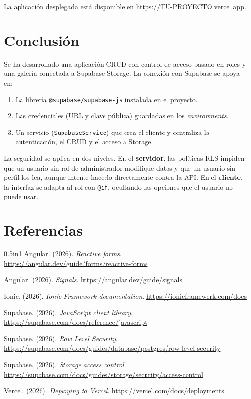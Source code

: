\documentclass[a4paper, 12pt]{article}
\begin{document}
La aplicación desplegada está disponible en
\url{https://TU-PROYECTO.vercel.app}.

\section{Conclusión}

Se ha desarrollado una aplicación CRUD con control de acceso basado en roles y
una galería conectada a Supabase Storage. La conexión con Supabase se apoya en:

\begin{enumerate}
  \item La librería \texttt{@supabase/supabase-js} instalada en el proyecto.
  \item Las credenciales (URL y clave pública) guardadas en los
        \textit{environments}.
  \item Un servicio (\texttt{SupabaseService}) que crea el cliente y centraliza
        la autenticación, el CRUD y el acceso a Storage.
\end{enumerate}

La seguridad se aplica en dos niveles. En el \textbf{servidor}, las políticas
RLS impiden que un usuario sin rol de administrador modifique datos y que un
usuario sin perfil los lea, aunque intente hacerlo directamente contra la API.
En el \textbf{cliente}, la interfaz se adapta al rol con \texttt{@if},
ocultando las opciones que el usuario no puede usar.

\section*{Referencias}

\begin{hangparas}{0.5in}{1}
Angular. (2026). \textit{Reactive forms}. \url{https://angular.dev/guide/forms/reactive-forms}

Angular. (2026). \textit{Signals}. \url{https://angular.dev/guide/signals}

Ionic. (2026). \textit{Ionic Framework documentation}. \url{https://ionicframework.com/docs}

Supabase. (2026). \textit{JavaScript client library}. \url{https://supabase.com/docs/reference/javascript}

Supabase. (2026). \textit{Row Level Security}. \url{https://supabase.com/docs/guides/database/postgres/row-level-security}

Supabase. (2026). \textit{Storage access control}. \url{https://supabase.com/docs/guides/storage/security/access-control}

Vercel. (2026). \textit{Deploying to Vercel}. \url{https://vercel.com/docs/deployments}
\end{hangparas}
\end{document}
